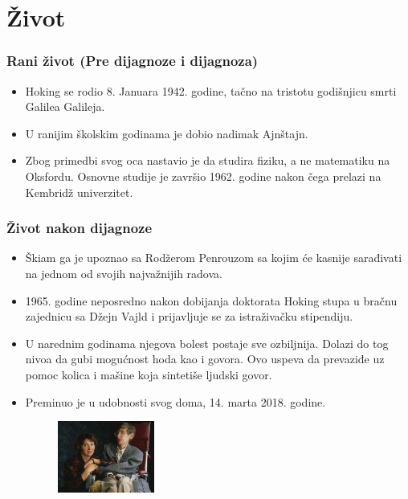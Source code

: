\documentclass{beamer}
\begin{document}
\section{Život}
\begin{frame}[fragile]\frametitle{Rani život (Pre dijagnoze i dijagnoza)}
\begin{itemize}	 \fontsize{9}{6}\selectfont
		
\item  Hoking se rodio 8. Januara 1942. godine, tačno na tristotu godišnjicu smrti Galilea Galileja.
\item  U ranijim školskim godinama je dobio nadimak Ajnštajn.
\item  Zbog primedbi svog oca nastavio je da studira fiziku, a ne matematiku na Oksfordu. Osnovne studije je završio 1962. godine nakon čega prelazi na Kembridž univerzitet.
\end{itemize}
\end{frame}
\begin{frame}[fragile]\frametitle{Život nakon dijagnoze}
	\begin{itemize} \fontsize{9}{6}\selectfont	 
		\item  Škiam ga je upoznao sa Rodžerom Penrouzom sa kojim će kasnije sarađivati na jednom od svojih najvažnijih radova.
		\item  1965. godine neposredno nakon dobijanja doktorata Hoking stupa u bračnu zajednicu sa Džejn Vajld i prijavljuje se za istraživačku stipendiju.
		\item  U narednim godinama njegova bolest postaje sve ozbiljnija. Dolazi do tog nivoa da gubi mogućnost hoda kao i govora. Ovo uspeva da prevaziđe uz pomoc kolica i mašine koja sintetiše ljudski govor. 
		\item  Preminuo je u udobnosti svog doma, 14. marta 2018. godine. 
\begin{figure}[h!] 
\begin{center}
\includegraphics[width=0.3\textwidth]{StivenHoking.jpeg}
\end{center} 
 \captionsetup{font=small}{Slika2: Stiven Hoking i njegova žena} 
\label{fig:StivenHoking}
\end{figure}
\end{itemize}
\end{frame}
\end{document}
